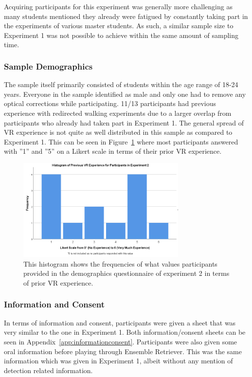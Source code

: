 Acquiring participants for this experiment was generally more challenging as many students mentioned they already were fatigued by constantly taking part in the experiments of various master students. As such, a similar sample size to Experiment 1 was not possible to achieve within the same amount of sampling time. 

\subsubsection{Sample Demographics}
The sample itself primarily consisted of students within the age range of 18-24 years. Everyone in the sample identified as male and only one had to remove any optical corrections while participating. 11/13 participants had previous experience with redirected walking experiments due to a larger overlap from participants who already had taken part in Experiment 1. The general spread of VR experience is not quite as well distributed in this sample as compared to Experiment 1. This can be seen in Figure~\ref{fig:ex2PriorVRExperience} where most participants answered with ''1'' and ''5'' on a Likert scale in terms of their prior VR experience.

\begin{figure}[tbph]
    \centering
    \includegraphics[width=0.75\textwidth]{figures/graphs/PriorVRExperienceExperiment2.png}
    \caption[Histogram on Prior VR Experience of Participants in Experiment 2]{This histogram shows the frequencies of what values participants provided in the demographics questionnaire of experiment 2 in terms of prior VR experience.}
    \label{fig:ex2PriorVRExperience}
\end{figure}

\subsubsection{Information and Consent}
In terms of information and consent, participants were given a sheet that was very similar to the one in Experiment 1. Both information/consent sheets can be seen in Appendix~\ref{app:informationconsent}. Participants were also given some oral information before playing through Ensemble Retriever. This was the same information which was given in Experiment 1, albeit without any mention of detection related information. 

